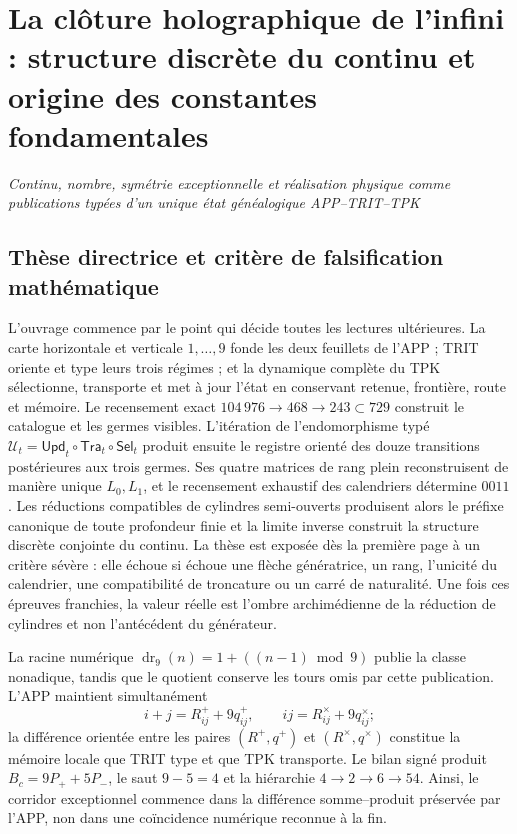 \chapter*{La clôture holographique de l'infini : structure discrète du continu et origine des constantes fondamentales}

\begin{center}
\large\itshape
Continu, nombre, symétrie exceptionnelle et réalisation physique comme publications
typées d'un unique état généalogique APP--TRIT--TPK
\end{center}

\section*{Thèse directrice et critère de falsification mathématique}

L'ouvrage commence par le point qui décide toutes les lectures ultérieures. La
carte horizontale et verticale \(1,\ldots,9\) fonde les deux feuillets de l'APP ; TRIT
oriente et type leurs trois régimes ; et la dynamique complète du TPK sélectionne,
transporte et met à jour l'état en conservant retenue, frontière, route et mémoire.
Le recensement exact \(104\,976\to468\to243\subset729\) construit le catalogue et les
germes visibles. L'itération de l'endomorphisme typé
\(\mathcal U_t=\mathsf{Upd}_t\circ\mathsf{Tra}_t\circ\mathsf{Sel}_t\) produit
ensuite le registre orienté des douze transitions postérieures aux trois
germes. Ses quatre matrices de rang plein reconstruisent de manière unique
\(L_0,L_1\), et le recensement exhaustif des calendriers détermine \(0011\). Les
réductions compatibles de cylindres semi-ouverts produisent alors le préfixe
canonique de toute profondeur finie et la limite inverse construit la structure
discrète conjointe du continu. La thèse est exposée dès la première page
à un critère sévère : elle échoue si échoue une flèche génératrice, un rang,
l'unicité du calendrier, une compatibilité de troncature ou un carré de
naturalité. Une fois ces épreuves franchies, la valeur réelle est l'ombre archimédienne de
la réduction de cylindres et non l'antécédent du générateur.

La racine numérique
\(\operatorname{dr}_9(n)=1+((n-1)\bmod9)\) publie la classe nonadique, tandis que
le quotient conserve les tours omis par cette publication. L'APP maintient
simultanément
\[
 i+j=R^+_{ij}+9q^+_{ij},\qquad
 ij=R^\times_{ij}+9q^\times_{ij};
\]
la différence orientée entre les paires \((R^+,q^+)\) et
\((R^\times,q^\times)\) constitue la mémoire locale que TRIT type et que TPK
transporte. Le bilan signé produit \(B_c=9P_++5P_-\), le saut
\(9-5=4\) et la hiérarchie \(4\to2\to6\to54\). Ainsi, le corridor
exceptionnel commence dans la différence somme--produit préservée par l'APP, non dans
une coïncidence numérique reconnue à la fin.

